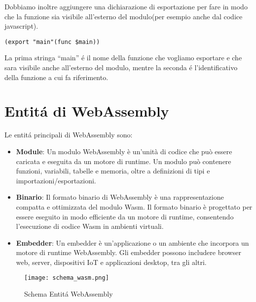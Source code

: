 \documentclass[../../main.tex]{subfiles}
\begin{document}
Dobbiamo inoltre aggiungere una dichiarazione di esportazione per fare in modo che la funzione sia visibile all'esterno del modulo(per esempio anche dal codice javascript).
\begin{lstlisting}[language=WebAssembly]
    (export "main"(func $main))
\end{lstlisting}
La prima stringa ``main'' é il nome della funzione che vogliamo esportare e che sara visibile anche all'esterno del modulo, mentre la seconda é l'identificativo della funzione a cui fa riferimento.

\section{Entitá di WebAssembly}
Le entitá principali di WebAssembly sono:
\begin{itemize}
    \item \textbf{Module}: Un modulo WebAssembly è un'unità di codice che può essere caricata e eseguita da un motore di runtime. Un modulo può contenere funzioni, variabili, tabelle e memoria, oltre a definizioni di tipi e importazioni/esportazioni.
    \item \textbf{Binario}: Il formato binario di WebAssembly è una rappresentazione compatta e ottimizzata del modulo Wasm. Il formato binario è progettato per essere eseguito in modo efficiente da un motore di runtime, consentendo l'esecuzione di codice Wasm in ambienti virtuali.
    \item \textbf{Embedder}: Un embedder è un'applicazione o un ambiente che incorpora un motore di runtime WebAssembly. Gli embedder possono includere browser web, server, dispositivi IoT e applicazioni desktop, tra gli altri.
\end{itemize}

\begin{figure}[H]
    \centering
    \texttt{[image: schema\_wasm.png]}
    \caption{Schema Entitá WebAssembly}
    \label{fig:wasm_entity}
\end{figure}
\end{document}
